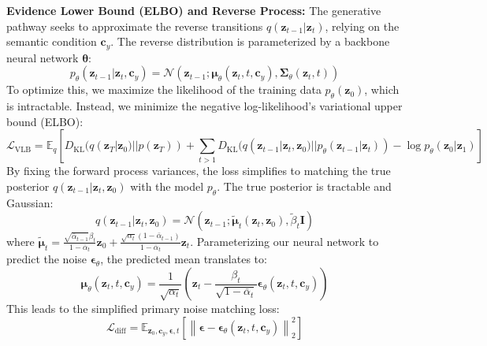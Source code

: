 \textbf{Evidence Lower Bound (ELBO) and Reverse Process:} The generative pathway seeks to approximate the reverse transitions $q(\mathbf{z}_{t-1} | \mathbf{z}_t)$, relying on the semantic condition $\mathbf{c}_y$. The reverse distribution is parameterized by a backbone neural network $\boldsymbol{\theta}$:
\begin{equation}\label{eq:reverse_diffusion}
p_\theta(\mathbf{z}_{t-1} | \mathbf{z}_t, \mathbf{c}_y) = \mathcal{N}(\mathbf{z}_{t-1}; \boldsymbol{\mu}_\theta(\mathbf{z}_t, t, \mathbf{c}_y), \boldsymbol{\Sigma}_\theta(\mathbf{z}_t, t))
\end{equation}
To optimize this, we maximize the likelihood of the training data $p_\theta(\mathbf{z}_0)$, which is intractable. Instead, we minimize the negative log-likelihood's variational upper bound (ELBO):
\begin{equation}
\mathcal{L}_{\text{VLB}} = \mathbb{E}_{q} \left[ D_{\text{KL}}(q(\mathbf{z}_{T}|\mathbf{z}_0) || p(\mathbf{z}_T)) + \sum_{t>1} D_{\text{KL}}(q(\mathbf{z}_{t-1}|\mathbf{z}_t, \mathbf{z}_0) || p_\theta(\mathbf{z}_{t-1}|\mathbf{z}_t)) - \log p_\theta(\mathbf{z}_0|\mathbf{z}_1) \right]
\end{equation}
By fixing the forward process variances, the loss simplifies to matching the true posterior $q(\mathbf{z}_{t-1}|\mathbf{z}_t, \mathbf{z}_0)$ with the model $p_\theta$. The true posterior is tractable and Gaussian:
\begin{equation}
q(\mathbf{z}_{t-1}|\mathbf{z}_t, \mathbf{z}_0) = \mathcal{N}(\mathbf{z}_{t-1}; \tilde{\boldsymbol{\mu}}_t(\mathbf{z}_t, \mathbf{z}_0), \tilde{\beta}_t \mathbf{I})
\end{equation}
where $\tilde{\boldsymbol{\mu}}_t = \frac{\sqrt{\bar{\alpha}_{t-1}} \beta_t}{1 - \bar{\alpha}_t} \mathbf{z}_0 + \frac{\sqrt{\alpha_t}(1 - \bar{\alpha}_{t-1})}{1 - \bar{\alpha}_t} \mathbf{z}_t$. Parameterizing our neural network to predict the noise $\boldsymbol{\epsilon}_\theta$, the predicted mean translates to:
\begin{equation}\label{eq:mu_theta}
\boldsymbol{\mu}_\theta(\mathbf{z}_t, t, \mathbf{c}_y) = \frac{1}{\sqrt{\alpha_t}} \left( \mathbf{z}_t - \frac{\beta_t}{\sqrt{1 - \bar{\alpha}_t}} \boldsymbol{\epsilon}_\theta(\mathbf{z}_t, t, \mathbf{c}_y) \right)
\end{equation}
This leads to the simplified primary noise matching loss:
\begin{equation}\label{eq:diffusion_loss}
\mathcal{L}_{\text{diff}} = \mathbb{E}_{\mathbf{z}_0, \mathbf{c}_y, \boldsymbol{\epsilon}, t} \left[ \left\| \boldsymbol{\epsilon} - \boldsymbol{\epsilon}_\theta(\mathbf{z}_t, t, \mathbf{c}_y) \right\|_2^2 \right]
\end{equation}

